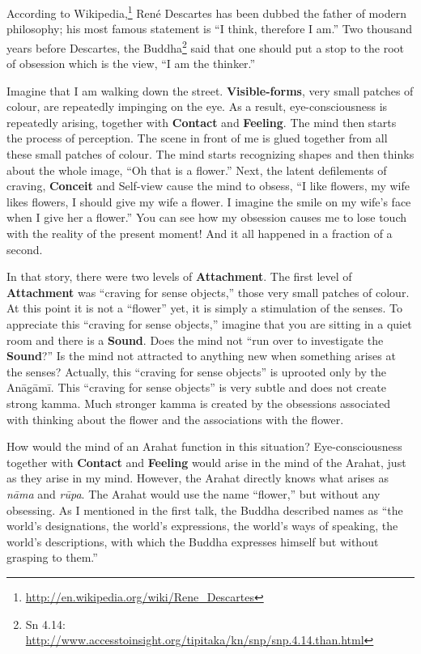 According to Wikipedia,\footnote{\url{http://en.wikipedia.org/wiki/Rene_Descartes}} René Descartes has been dubbed the father of modern philosophy; his most famous statement is “I think, therefore I am.” Two thousand years before Descartes, the Buddha\footnote{Sn 4.14: \url{http://www.accesstoinsight.org/tipitaka/kn/snp/snp.4.14.than.html}} said that one should put a stop to the root of obsession which is the view, “I am the thinker.”

Imagine that I am walking down the street. \textbf{Visible-forms}, very small patches of colour, are repeatedly impinging on the eye. As a result, eye-consciousness is repeatedly arising, together with \textbf{Contact} and \textbf{Feeling}. The mind then starts the process of perception. The scene in front of me is glued together from all these small patches of colour. The mind starts recognizing shapes and then thinks about the whole image, “Oh that is a flower.” Next, the latent defilements of craving, \textbf{Conceit} and Self-view cause the mind to obsess, “I like flowers, my wife likes flowers, I should give my wife a flower. I imagine the smile on my wife’s face when I give her a flower.” You can see how my obsession causes me to lose touch with the reality of the present moment! And it all happened in a fraction of a second.

In that story, there were two levels of \textbf{Attachment}. The first level of \textbf{Attachment} was “craving for sense objects,” those very small patches of colour. At this point it is not a “flower” yet, it is simply a stimulation of the senses. To appreciate this “craving for sense objects,” imagine that you are sitting in a quiet room and there is a \textbf{Sound}. Does the mind not “run over to investigate the \textbf{Sound}?” Is the mind not attracted to anything new when something arises at the senses? Actually, this “craving for sense objects” is uprooted only by the Anāgāmī. This “craving for sense objects” is very subtle and does not create strong kamma. Much stronger kamma is created by the obsessions associated with thinking about the flower and the associations with the flower.

How would the mind of an Arahat function in this situation? Eye-consciousness together with \textbf{Contact} and \textbf{Feeling} would arise in the mind of the Arahat, just as they arise in my mind. However, the Arahat directly knows what arises as \textit{nāma} and \textit{rūpa}. The Arahat would use the name “flower,” but without any obsessing. As I mentioned in the first talk, the Buddha described names as “the world’s designations, the world’s expressions, the world’s ways of speaking, the world’s descriptions, with which the Buddha expresses himself but without grasping to them.”


